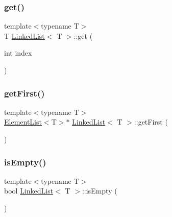 \mbox{\label{class_linked_list_a25079ed9b408efad63a1522c818d8705}} 
\subsubsection{\texorpdfstring{get()}{get()}}
{\footnotesize\ttfamily template$<$typename T$>$ \\
T \mbox{\hyperlink{class_linked_list}{Linked\+List}}$<$ T $>$\+::get (\begin{DoxyParamCaption}\item[{int}]{index }\end{DoxyParamCaption})\hspace{0.3cm}{\ttfamily [inline]}}

\mbox{\label{class_linked_list_a4ea79e8ffd6bb92736df640d86a04705}} 
\subsubsection{\texorpdfstring{get\+First()}{getFirst()}}
{\footnotesize\ttfamily template$<$typename T$>$ \\
\mbox{\hyperlink{struct_element_list}{Element\+List}}$<$T$>$$\ast$ \mbox{\hyperlink{class_linked_list}{Linked\+List}}$<$ T $>$\+::get\+First (\begin{DoxyParamCaption}{ }\end{DoxyParamCaption})\hspace{0.3cm}{\ttfamily [inline]}}

\mbox{\label{class_linked_list_a7ecbb28e82117a680839ed0dc28ebdce}} 
\subsubsection{\texorpdfstring{is\+Empty()}{isEmpty()}}
{\footnotesize\ttfamily template$<$typename T$>$ \\
bool \mbox{\hyperlink{class_linked_list}{Linked\+List}}$<$ T $>$\+::is\+Empty (\begin{DoxyParamCaption}{ }\end{DoxyParamCaption})\hspace{0.3cm}{\ttfamily [inline]}}

